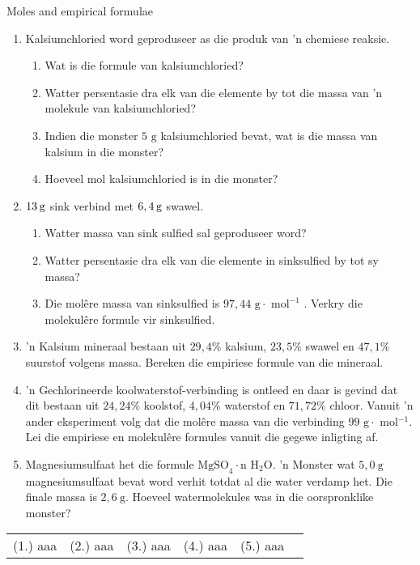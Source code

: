             \begin{exercises}{Moles and empirical formulae}
      \label{m38712*id281924}\begin{enumerate}[noitemsep, label=\textbf{\arabic*}. ] 
            \label{m38712*uid73}\item Kalsiumchloried word geproduseer as die produk van 'n chemiese reaksie.
\label{m38712*id281940}\begin{enumerate}[noitemsep, label=\textbf{\alph*}. ] 
            \label{m38712*uid74}\item Wat is die formule van kalsiumchloried?
\label{m38712*uid75}\item Watter persentasie dra elk van die elemente by tot die massa van 'n molekule van kalsiumchloried?
\label{m38712*uid76}\item Indien die monster $5 \text{ g}$ kalsiumchloried bevat, wat is die massa van kalsium in die monster?
\label{m38712*uid77}\item Hoeveel mol kalsiumchloried is in die monster?
\end{enumerate}
                \label{m38712*uid78}\item $13\phantom{\rule{2pt}{0ex}}\text{g}$ sink verbind met $6,4\phantom{\rule{2pt}{0ex}}\text{g}$ swawel.
\label{m38712*id282007}\begin{enumerate}[noitemsep, label=\textbf{\alph*}. ] 
\item Watter massa van sink sulfied sal geproduseer word?
\item Watter persentasie dra elk van die elemente in sinksulfied by tot sy massa?
\item Die mol\^ere massa van sinksulfied is $97,44 \text{ g} \cdot \text{ mol}^{−1}$ . Verkry die molekul\^ere formule vir sinksulfied.
\end{enumerate}
                \label{m38712*uid82}\item 'n Kalsium mineraal bestaan ​​uit $29,4\%$ kalsium, $23,5\%$ swawel en $47,1\%$ suurstof volgens massa. Bereken die empiriese formule van die mineraal.
\label{m38712*uid83}\item 'n Gechlorineerde koolwaterstof-verbinding is ontleed en daar is gevind dat dit bestaan ​​uit $24,24\%$ koolstof, $4,04\%$ waterstof en $71,72\%$ chloor. Vanuit  'n ander eksperiment volg dat die mol\^ere massa van die verbinding $99\text{ g} \cdot \text{ mol}{}^{-1}$. Lei die empiriese en molekulêre formules vanuit die gegewe inligting af.
\item Magnesiumsulfaat het die formule $\text{MgSO}_{4} \cdot \text{n H}_{2}\text{O}$. 'n Monster wat $5,0 ~\text{g}$ magnesiumsulfaat bevat word verhit totdat al die water verdamp het. Die finale massa is $2,6~\text{g}$. Hoeveel watermolekules was in die oorspronklike monster? 
\end{enumerate}
\practiceinfo
\par 
 \par \begin{tabular}[h]{cccccc}
 (1.) aaa  &  (2.) aaa  &  (3.) aaa  &  (4.) aaa  & (5.) aaa \end{tabular}
\end{exercises}
